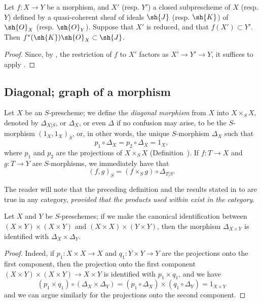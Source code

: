 \begin{corollary}[5.2.4]
\label{I.5.2.4}
Let $f:X\to Y$ be a morphism, and $X'$ (resp. $Y'$) a closed subprescheme of $X$ (resp. $Y$) defined by a quasi-coherent sheaf of ideals $\sh{J}$ (resp. $\sh{K}$) of $\sh{O}_X$ (resp. $\sh{O}_Y$).
Suppose that $X'$ is reduced, and that $f(X')\subset Y'$.
Then $f^*(\sh{K})\sh{O}_X\subset\sh{J}$.
\end{corollary}

\begin{proof}
Since, by , the restriction of $f$ to $X'$ factors as $X'\to Y'\to Y$, it suffices to apply .
\end{proof}

\subsection{Diagonal; graph of a morphism}
\label{subsection:I.5.3}
\label{I.5.3}

\begin{env}[5.3.1]
\label{I.5.3.1}
Let $X$ be an $S$-prescheme;
we define the \emph{diagonal morphism} from $X$ into $X\times_S X$, denoted by $\Delta_{X|S}$, or $\Delta_X$, or even $\Delta$ if no confusion may arise, to be the $S$-morphism $(1_X,1_X)_S$, or, in other words, the unique $S$-morphism $\Delta_X$ such that
\[
\label{I.5.3.1.1}
  p_1\circ\Delta_X=p_2\circ\Delta_X=1_X,
  \tag{5.3.1.1}
\]
where $p_1$ and $p_2$ are the projections of $X\times_S X$ (Definition~).
If $f:T\to X$ and $g:T\to Y$ are $S$-morphisms, we immediately have that
\[
\label{I.5.3.1.2}
  (f,g)_S=(f\times_S g)\circ\Delta_{T|S}.
  \tag{5.3.1.2}
\]

The reader will note that the preceding definition and the results stated in  to  are true in any category, \emph{provided that the products used within exist in the category}.
\end{env}

\begin{proposition}[5.3.2]
\label{I.5.3.2}
Let $X$ and $Y$ be $S$-preschemes;
if we make the canonical identification between $(X\times Y)\times(X\times Y)$ and $(X\times X)\times(Y\times Y)$, then the morphism $\Delta_{X\times Y}$ is identified with $\Delta_X\times\Delta_Y$.
\end{proposition}

\begin{proof}
Indeed, if $p_1:X\times X\to X$ and $q_1:Y\times Y\to Y$ are the projections onto the first component, then the projection onto the first component $(X\times Y)\times(X\times Y)\to X\times Y$ is identified with $p_1\times q_1$, and we have
\[
  (p_1\times q_1)\circ(\Delta_X\times\Delta_Y)=(p_1\circ\Delta_X)\times(q_1\circ\Delta_Y)=1_{X\times Y}
\]
and we can argue similarly for the projections onto the second component.
\end{proof}

